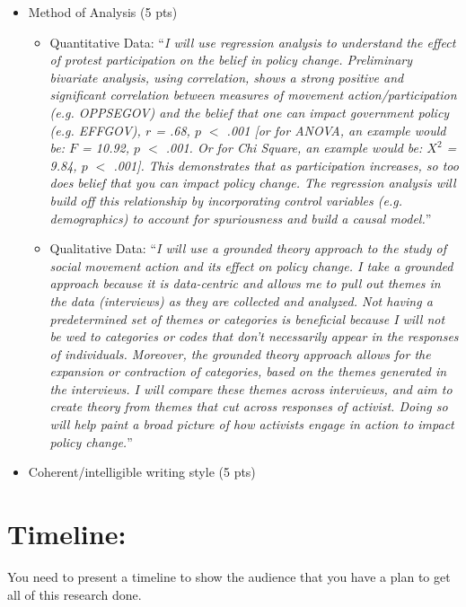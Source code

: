 \documentclass{article}
\begin{document}
\begin{itemize}
\item Method of Analysis (5 pts)
	\begin{itemize}
	\item Quantitative Data:
	\newline ``{\it{{\color{red}I will use regression analysis to understand the effect of protest participation on the belief in policy change. Preliminary bivariate analysis, using correlation, shows a strong positive and significant correlation between measures of movement action/participation (e.g. OPPSEGOV) and the belief that one can impact government policy (e.g. EFFGOV), $r$ = .68, $p$ $<$ .001 {\color{black}[or for ANOVA, an example would be: $F$ = 10.92, $p$ $<$ .001. Or for Chi Square, an example would be: $X^2$ = 9.84, $p$ $<$ .001]}. This demonstrates that as participation increases, so too does belief that you can impact policy change. The regression analysis will build off this relationship by incorporating control variables (e.g. demographics) to account for spuriousness and build a causal model.}}}''
	\item Qualitative Data:
	\newline ``{\it{{\color{red}I will use a grounded theory approach to the study of social movement action and its effect on policy change. I take a grounded approach because it is data-centric and allows me to pull out themes in the data (interviews) as they are collected and analyzed. Not having a predetermined set of themes or categories is beneficial because I will not be wed to categories or codes that don't necessarily appear in the responses of individuals. Moreover, the grounded theory approach allows for the expansion or contraction of categories, based on the themes generated in the interviews. I will compare these themes across interviews, and aim to create theory from themes that cut across responses of activist. Doing so will help paint a broad picture of how activists engage in action to impact policy change.}}}''
	\end{itemize}
\item Coherent/intelligible writing style (5 pts)
\end{itemize}

\section*{Timeline:}
You need to present a timeline to show the audience that you have a plan to get all of this research done.
\end{document}
